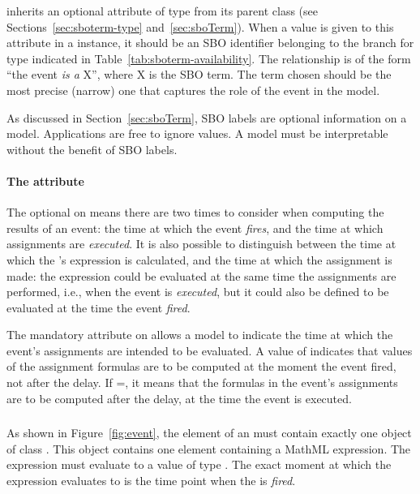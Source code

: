 \Event inherits an optional  attribute of type
 from its parent class \SBase (see
Sections~\ref{sec:sboterm-type} and~\ref{sec:sboTerm}).  When a
value is given to this attribute in a \Event instance, it should
be an SBO identifier belonging to the branch for type \Event
indicated in Table~\ref{tab:sboterm-availability}.  The
relationship is of the form ``the event \emph{is a} X'', where X
is the SBO term.  The term chosen should be the most precise
(narrow) one that captures the role of the event in the model.

As discussed in Section~\ref{sec:sboTerm}, SBO labels are optional
information on a model.  Applications are free to ignore
 values.  A model must be interpretable without the
benefit of SBO labels.


\paragraph{The  attribute}
\label{sec:event-usevaluesfromtriggertime}

The optional \Delay on \Event means there are two times to
consider when computing the results of an event: the time at which
the event \emph{fires}, and the time at which assignments are
\emph{executed}.  It is also possible to distinguish between the
time at which the \EventAssignment's expression is calculated, and
the time at which the assignment is made: the expression could be
evaluated at the same time the assignments are performed, i.e.,
when the event is \emph{executed}, but it could also be defined to
be evaluated at the time the event \emph{fired}.

The mandatory attribute  on \Event
allows a model to indicate the time at which the event's
assignments are intended to be evaluated.  A value of 
indicates that values of the assignment formulas are to be
computed at the moment the event fired, not after the delay.  If
=, it means that the
formulas in the event's assignments are to be computed after the
delay, at the time the event is executed.


\subsubsection{}
\label{sec:trigger}
\label{sec:event-trigger}

As shown in Figure~\ref{fig:event}, the  element of
an \Event must contain exactly one object of class \Trigger.  This
object contains one  element containing a MathML
expression.  The expression must evaluate to a value of type
.  The exact moment at which the expression
evaluates to  is the time point when the \Event is
\emph{fired}.

